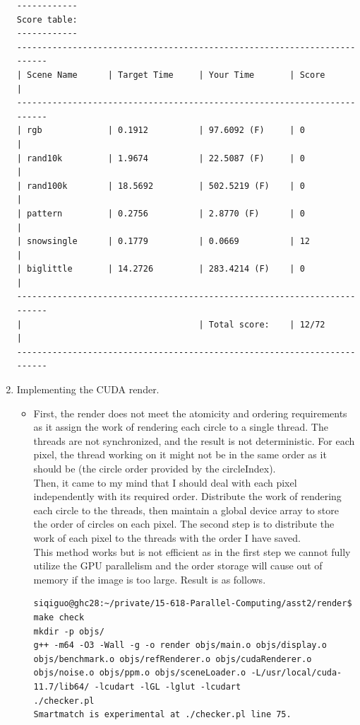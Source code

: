 \documentclass[letterpaper,11pt]{exam}
\begin{document}
\begin{questions}
\begin{enumerate}[label=\roman*.]
\begin{lstlisting}[]
------------
Score table:
------------
-------------------------------------------------------------------------
| Scene Name      | Target Time     | Your Time       | Score           |
-------------------------------------------------------------------------
| rgb             | 0.1912          | 97.6092 (F)     | 0               |
| rand10k         | 1.9674          | 22.5087 (F)     | 0               |
| rand100k        | 18.5692         | 502.5219 (F)    | 0               |
| pattern         | 0.2756          | 2.8770 (F)      | 0               |
| snowsingle      | 0.1779          | 0.0669          | 12              |
| biglittle       | 14.2726         | 283.4214 (F)    | 0               |
-------------------------------------------------------------------------
|                                   | Total score:    | 12/72           |
-------------------------------------------------------------------------
            \end{lstlisting}


        \item Implementing the CUDA render.

              \begin{itemize}
                  \item First, the render does not meet the atomicity and ordering requirements as it assign the work of rendering each circle to a single thread.
                        The threads are not synchronized, and the result is not deterministic.
                        For each pixel, the thread working on it might not be in the same order as it should be (the circle order provided by the circleIndex). \\

                        Then, it came to my mind that I should deal with each pixel independently with its required order.
                        Distribute the work of rendering each circle to the threads, then maintain a global device array to store the order of circles on each pixel.
                        The second step is to distribute the work of each pixel to the threads with the order I have saved. \\

                        This method works but is not efficient as in the first step we cannot fully utilize the GPU parallelism and the order storage will cause out of memory if the image is too large. Result is as follows.

                        \begin{lstlisting}
siqiguo@ghc28:~/private/15-618-Parallel-Computing/asst2/render$ make check
mkdir -p objs/
g++ -m64 -O3 -Wall -g -o render objs/main.o objs/display.o objs/benchmark.o objs/refRenderer.o objs/cudaRenderer.o objs/noise.o objs/ppm.o objs/sceneLoader.o -L/usr/local/cuda-11.7/lib64/ -lcudart -lGL -lglut -lcudart 
./checker.pl
Smartmatch is experimental at ./checker.pl line 75.


\end{lstlisting}
\end{itemize}
\end{enumerate}
\end{questions}
\end{document}
